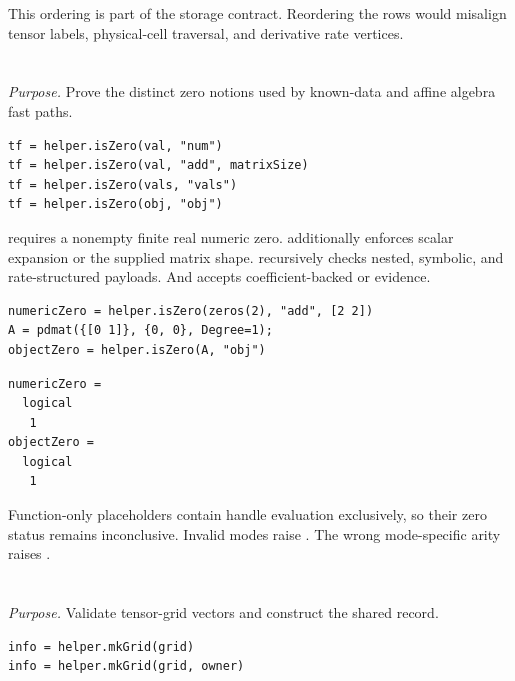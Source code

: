 \remarkshead
This ordering is part of the storage contract.  Reordering the rows would misalign tensor labels, physical-cell traversal, and derivative rate vertices.

\section{\texorpdfstring{}{helper.isZero}}

\textit{Purpose.} Prove the distinct zero notions used by known-data and affine algebra fast paths.

\syntaxhead
\begin{lstlisting}[style=dpsyntax]
tf = helper.isZero(val, "num")
tf = helper.isZero(val, "add", matrixSize)
tf = helper.isZero(vals, "vals")
tf = helper.isZero(obj, "obj")
\end{lstlisting}

\descriptionhead
{} requires a nonempty finite real numeric zero.  additionally enforces scalar expansion or the supplied matrix shape.  recursively checks nested, symbolic, and rate-structured payloads. And  accepts coefficient-backed  or  evidence.

\examplehead
\begin{lstlisting}[style=dpmatlab]
numericZero = helper.isZero(zeros(2), "add", [2 2])
A = pdmat({[0 1]}, {0, 0}, Degree=1);
objectZero = helper.isZero(A, "obj")
\end{lstlisting}
\begin{lstlisting}[style=dpoutput]
numericZero =
  logical
   1
objectZero =
  logical
   1
\end{lstlisting}

\remarkshead
Function-only  placeholders contain handle evaluation exclusively, so their zero status remains inconclusive. Invalid modes raise . The wrong mode-specific arity raises .

\section{\texorpdfstring{}{helper.mkGrid}}

\textit{Purpose.} Validate tensor-grid vectors and construct the shared  record.

\syntaxhead
\begin{lstlisting}[style=dpsyntax]
info = helper.mkGrid(grid)
info = helper.mkGrid(grid, owner)
\end{lstlisting}

